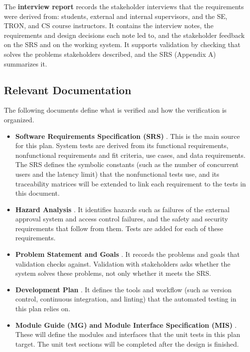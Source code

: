 \documentclass[12pt, titlepage]{article}
\begin{document}
The \textbf{interview report} records the stakeholder interviews that the requirements were derived from: students, external and internal supervisors, and the SE, TRON, and CS course instructors. It contains the interview notes, the requirements and design decisions each note led to, and the stakeholder feedback on the SRS and on the working system. It supports validation by checking that \projname{} solves the problems stakeholders described, and the SRS (Appendix A) summarizes it.

\subsection{Relevant Documentation}

The following documents define what is verified and how the verification is organized.
\begin{itemize}
  \item \textbf{Software Requirements Specification (SRS)} \citep{SRS}. This is the main source for this plan. System tests are derived from its functional requirements, nonfunctional requirements and fit criteria, use cases, and data requirements. The SRS defines the symbolic constants (such as the number of concurrent users and the latency limit) that the nonfunctional tests use, and its traceability matrices will be extended to link each requirement to the tests in this document.
  \item \textbf{Hazard Analysis} \citep{HazardAnalysis}. It identifies hazards such as failures of the external approval system and access control failures, and the safety and security requirements that follow from them. Tests are added for each of these requirements.
  \item \textbf{Problem Statement and Goals} \citep{ProblemStatement}. It records the problems and goals that validation checks against. Validation with stakeholders asks whether the system solves these problems, not only whether it meets the SRS.
  \item \textbf{Development Plan} \citep{DevelopmentPlan}. It defines the tools and workflow (such as version control, continuous integration, and linting) that the automated testing in this plan relies on.
  \item \textbf{Module Guide (MG) and Module Interface Specification (MIS)} \citep{MG, MIS}. These will define the modules and interfaces that the unit tests in this plan target. The unit test sections will be completed after the design is finished.
\end{itemize}
\end{document}
